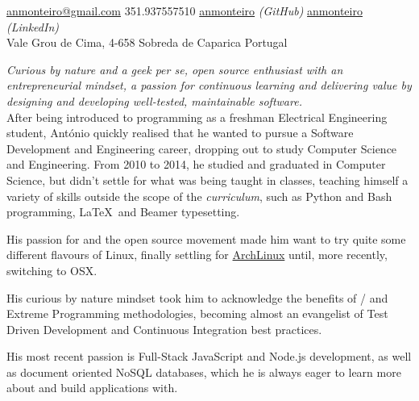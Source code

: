 \documentclass[10pt,a4paper]{article}
\begin{document}
\sloppy  %



\nobreakvspace{0.3em}  %

\noindent\href{mailto:anmonteiro.at.gmail.dot.com}{anmonteiro\mbox{}@\mbox{}gmail.com}\sbull
\textsmaller{+}351.937557510\sbull
{\newnums \href{http://www.github.com/anmonteiro}{anmonteiro}} \emph{(GitHub)}\sbull
\href{http://www.linkedin.com/in/anmonteiro}{anmonteiro} \emph{(LinkedIn)}
\\
Vale Grou de Cima, 4-658\sbull
Sobreda de Caparica\sbull
Portugal

\spacedhrule{0.9em}{-0.4em}  %


\vspace{-1.3em}  %
\begin{multicols}{2}  %
\emph{Curious by nature and a geek \emph{per se}, open source enthusiast with an entrepreneurial mindset, a passion for continuous learning and delivering value by designing and developing well-tested, maintainable software.}\\

After being introduced to programming as a freshman Electrical Engineering student, António quickly realised that he wanted to pursue a Software Development and Engineering career, dropping out to study Computer Science and Engineering. From 2010 to 2014, he studied and graduated in Computer Science, but didn't settle for what was being taught in classes, teaching himself a variety of skills outside the scope of the \emph{curriculum}, such as Python and Bash programming, \LaTeX\ and Beamer typesetting.

His passion for  and the open source movement made him want to try quite some different flavours of Linux, finally settling for \href{https://www.archlinux.org/}{ArchLinux} until, more recently, switching to OSX.

His curious by nature mindset took him to acknowledge the benefits of / and Extreme Programming methodologies, becoming almost an evangelist of Test Driven Development and Continuous Integration best practices.

His most recent passion is Full-Stack JavaScript and Node.js development, as well as document oriented NoSQL databases, which he is always eager to learn more about and build applications with.
\end{multicols}
\end{document}
